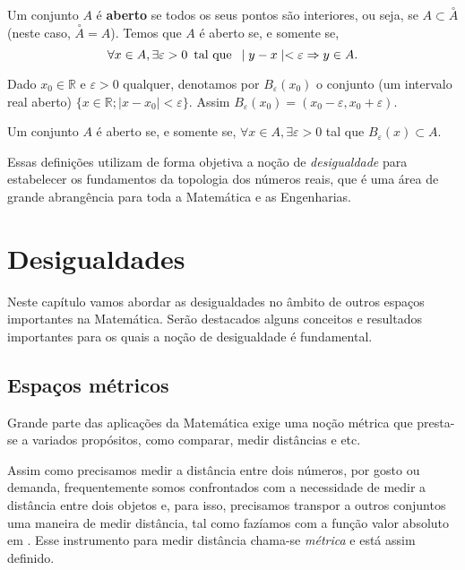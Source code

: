 \documentclass[glenn,refnum,codigo]{Estilo}
\begin{document}
\begin{define}
	Um conjunto $A$ é \textbf{aberto} se todos os seus pontos são interiores, ou
	seja,
	se $A \subset \stackrel{\circ}{A}$ (neste caso, $\stackrel{\circ}{A} = A$).
	Temos que $A$ é aberto se, e somente se,
	\[
	\forall x \in A, \exists \varepsilon > 0\,\,\, \hbox{tal que}\,\,\, \mid y - x
	\mid < \varepsilon \Rightarrow y \in A.
	\]
\end{define}


\begin{define}
	Dado $x_{0} \in \mathbb{R}$  e $\varepsilon > 0$ qualquer, denotamos por
	$B_{\varepsilon}(x_{0})$ o conjunto (um intervalo real aberto) $\{x \in
	\mathbb{R}; \mid x - x_{0} \mid < \varepsilon\}$. Assim $B_{\varepsilon}(x_{0})
	= (x_{0} - \varepsilon, x_{0} + \varepsilon)$.
\end{define}

\begin{define}
	Um conjunto $A$ é aberto se, e somente se, $\forall x \in A, \exists \varepsilon
	> 0$ tal que $B_{\varepsilon}(x) \subset A$.
\end{define}

Essas definições utilizam de forma objetiva a noção de {\itshape desigualdade}
para estabelecer os
fundamentos da topologia dos números reais, que é uma área de grande abrangência
para toda a Matemática e as Engenharias.


\chapter{Desigualdades}

Neste capítulo vamos abordar as desigualdades no âmbito de outros
espaços importantes na Matemática. Serão destacados alguns conceitos
e resultados importantes para os quais a noção de desigualdade é fundamental.

\section{Espaços métricos}

Grande parte das aplicações da Matemática exige uma noção métrica que
presta-se a variados propósitos, como comparar, medir distâncias e etc.

Assim como precisamos medir a distância entre dois números, por gosto ou
demanda, frequentemente somos confrontados com a necessidade de medir a
distância entre dois objetos e, para isso, precisamos transpor a outros
conjuntos uma maneira de medir distância, tal como fazíamos com a função valor
absoluto em \R. Esse instrumento para medir distância chama-se
{\itshape métrica} e está assim definido.
\end{document}
